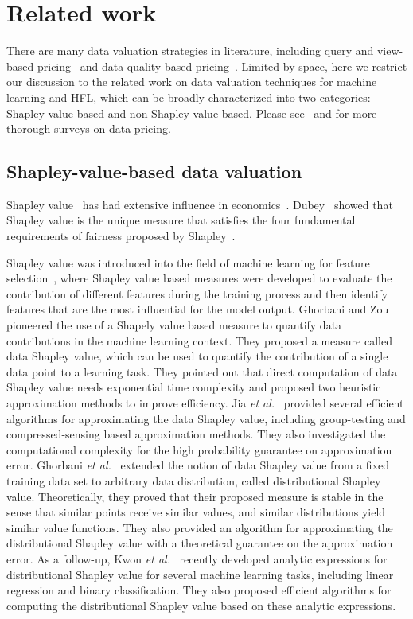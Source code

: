 \section{Related work} \label{sec:7-2}
There are many data valuation strategies in literature, including query and view-based pricing~\cite{koutris2015query, koutris2012querymarket, koutris2013toward} and data quality-based pricing~\cite{heckman2015pricing, pipino2002data}. Limited by space, here we restrict our discussion to the related work on data valuation techniques for machine learning and HFL, which can be broadly characterized into two categories: Shapley-value-based and non-Shapley-value-based. Please see~\cite{pei2020survey} and \cite{cong2021data} for more thorough surveys on data pricing. 

\subsection{Shapley-value-based data valuation}
Shapley value~\cite{shapley201617} has had extensive influence in economics~\cite{gul1989bargaining}. Dubey~\cite{dubey1975uniqueness} showed that Shapley value is the unique measure that satisfies the four fundamental requirements of fairness proposed by Shapley~\cite{shapley201617}. 

Shapley value was introduced into the field of machine learning for feature selection~\cite{cohen2005feature, lundberg2017unified,strumbelj2010efficient}, where Shapley value based measures were developed to evaluate the contribution of different features during the training process and then identify features that are the most influential for the model output. Ghorbani and Zou~\cite{ghorbani2019data} pioneered the use of a Shapely value based measure to quantify data contributions in the machine learning context. They proposed a measure called data Shapley value, which can be used to quantify the contribution of a single data point to a learning task. They pointed out that direct computation of data Shapley value needs exponential time complexity and proposed two heuristic approximation methods to improve efficiency. Jia \textit{et al.}~\cite{jia2019towards} provided several efficient algorithms for approximating the data Shapley value, including group-testing and compressed-sensing based approximation methods. They also investigated the computational complexity for the high probability guarantee on approximation error. Ghorbani \textit{et al.}~\cite{ghorbani2020distributional} extended the notion of data Shapley value from a fixed training data set to arbitrary data distribution, called distributional Shapley value. Theoretically, they proved that their proposed measure is stable in the sense that similar points receive similar values, and similar distributions yield similar value functions. They also provided an algorithm for approximating the distributional Shapley value with a theoretical guarantee on the approximation error. As a follow-up,  Kwon \textit{et al.}~\cite{kwon2021efficient} recently developed analytic expressions for distributional Shapley value for several machine learning tasks, including linear regression and binary classification. They also proposed efficient algorithms for computing the distributional Shapley value based on these analytic expressions. 

